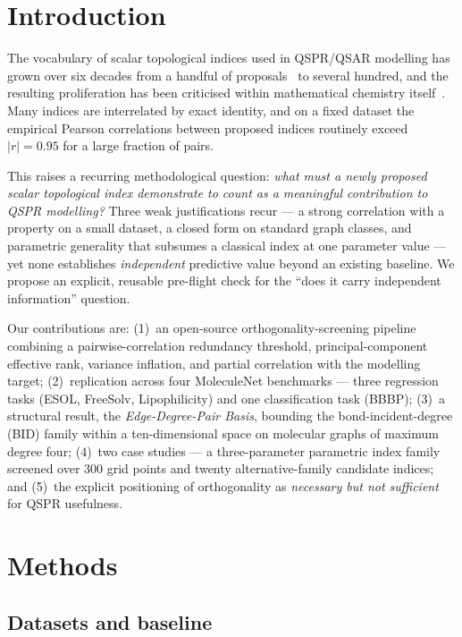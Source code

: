 \documentclass[11pt,a4paper]{article}
\theoremstyle{definition}
\begin{document}
\section{Introduction}

The vocabulary of scalar topological indices used in QSPR/QSAR
modelling has grown over six decades from a handful of
proposals~\cite{Wiener1947, Randic1975, Gutman1972} to several
hundred, and the resulting proliferation has been criticised within
mathematical chemistry itself~\cite{Gutman2013Degree}. Many indices
are interrelated by exact identity, and on a fixed dataset the
empirical Pearson correlations between proposed indices routinely
exceed $|r| = 0.95$ for a large fraction of pairs.

This raises a recurring methodological question: \emph{what must a
newly proposed scalar topological index demonstrate to count as a
meaningful contribution to QSPR modelling?} Three weak
justifications recur --- a strong correlation with a property on a
small dataset, a closed form on standard graph classes, and
parametric generality that subsumes a classical index at one
parameter value --- yet none establishes \emph{independent}
predictive value beyond an existing baseline. We propose an
explicit, reusable pre-flight check for the ``does it carry
independent information'' question.

Our contributions are: (1)~an open-source orthogonality-screening
pipeline combining a pairwise-correlation redundancy threshold,
principal-component effective rank, variance inflation, and partial
correlation with the modelling target; (2)~replication across four
MoleculeNet benchmarks --- three regression tasks (ESOL, FreeSolv,
Lipophilicity) and one classification task (BBBP); (3)~a structural
result, the \emph{Edge-Degree-Pair Basis}, bounding the
bond-incident-degree (BID) family within a ten-dimensional space on
molecular graphs of maximum degree four; (4)~two case studies --- a
three-parameter parametric index family~\cite{Paper1_Wuzi} screened
over $300$ grid points and twenty alternative-family candidate
indices; and (5)~the explicit positioning of orthogonality as
\emph{necessary but not sufficient} for QSPR usefulness.

\section{Methods}

\subsection{Datasets and baseline}
\end{document}
